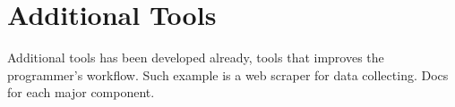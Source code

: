 


  \section*{Additional Tools}

    Additional tools has been developed already, tools that improves the programmer's workflow.
    Such example is a web scraper for data collecting.
    Docs for each major component.
